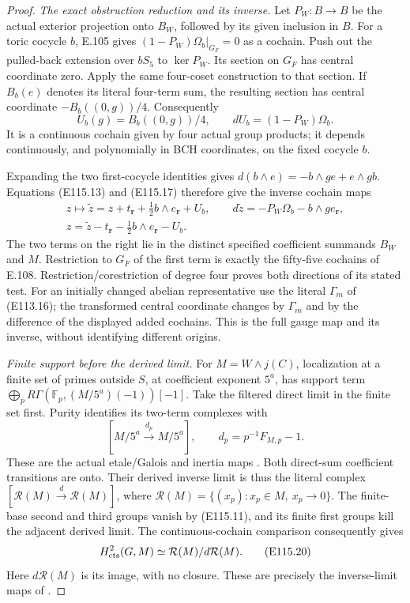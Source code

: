 \begin{proof}
\emph{The exact obstruction reduction and its inverse.}
Let $P_W:B\to B$ be the actual exterior projection onto
$B_W$, followed by its given inclusion in $B$.
For a toric cocycle $b$, E.105 gives
$(1-P_W)\Omega_b|_{G_F}=0$ as a cochain.
Push out the pulled-back extension over $bS_5$ to
$\ker P_W$.  Its section on $G_F$ has central coordinate
zero.  Apply the same four-coset construction to that section.
If $B_b(e)$ denotes its literal four-term sum, the resulting
section has central coordinate $-B_b((0,g))/4$.
Consequently
\[
 U_b(g)=B_b((0,g))/4,\qquad
        dU_b=(1-P_W)\Omega_b.
 \tag{E115.17}
\]
It is a continuous cochain given by four actual group products;
it depends continuously, and polynomially in BCH coordinates,
on the fixed cocycle $b$.

Expanding the two first-cocycle identities gives
$d(b\wedge e)=-b\wedge ge+e\wedge gb$.
Equations (E115.13) and (E115.17) therefore give the inverse
cochain maps
\[
 \begin{gathered}
 z\longmapsto
 \widetilde z=z+t_{\mathbf r}+\tfrac12 b\wedge e_{\mathbf r}+U_b,
 \qquad
 d\widetilde z=-P_W\Omega_b-b\wedge g e_{\mathbf r},\\
 z=\widetilde z-t_{\mathbf r}
                  -\tfrac12 b\wedge e_{\mathbf r}-U_b.
 \end{gathered}
 \tag{E115.18}
\]
The two terms on the right lie in the distinct specified
coefficient summands $B_W$ and $M$.
Restriction to $G_F$ of the first term is exactly the
fifty-five cochains of E.108.  Restriction/corestriction of
degree four proves both directions of its stated test.
For an initially changed abelian representative use the
literal $\Gamma_m$ of (E113.16); the transformed central
coordinate changes by $\Gamma_m$ and by the difference
of the displayed added cochains.  This is the full gauge
map and its inverse, without identifying different origins.

\emph{Finite support before the derived limit.}
For $M=W\wedge j(C)$, localization at a finite set of primes
outside $S$, at coefficient exponent $5^a$, has support
term $\bigoplus_p R\Gamma(\mathbb F_p,(M/5^a)(-1))[-1]$.
Take the filtered direct limit in the finite set first.
Purity identifies its two-term complexes with
\[
 [M/5^a\xrightarrow{\ d_p\ }M/5^a],\qquad
             d_p=p^{-1}F_{M,p}-1.
 \tag{E115.19}
\]
These are the actual etale/Galois and inertia maps
\cite[II.0.1(f), II.1.7(b), II.2.9]{E_MilneADT}.
Both direct-sum coefficient transitions are onto.
Their derived inverse limit is thus the literal complex
$[\mathcal R(M)\xrightarrow d\mathcal R(M)]$, where
$\mathcal R(M)=\{(x_p):x_p\in M,\ x_p\to0\}$.
The finite-base second and third groups vanish by (E115.11),
and its finite first groups kill the adjacent derived limit.
The continuous-cochain comparison consequently gives
\[
 H^2_{\rm cts}(G,M)
       \simeq\mathcal R(M)/d\mathcal R(M).
 \tag{E115.20}
\]
Here $d\mathcal R(M)$ is its image, with no closure.
These are precisely the inverse-limit maps of
\cite[Proposition 1.6 and Theorem 2.2]{E_JannsenContinuous}.


\end{proof}
